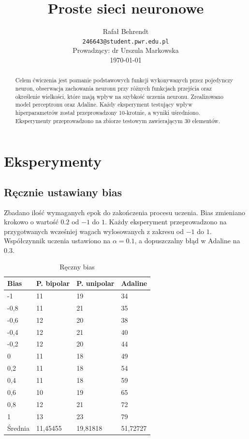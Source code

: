 \documentclass{article}
\title{ Proste sieci neuronowe }
\author{
  Rafał Behrendt \\
  \texttt{246643@student.pwr.edu.pl} \\
  Prowadzący: dr Urszula Markowska \\
  \today
}
\begin{document}
\maketitle

\begin{abstract}
  Celem ćwiczenia jest poznanie podstawowych funkcji wykonywanych przez pojedynczy neuron,
  obserwacja zachowania neuronu przy różnych funkcjach przejścia oraz określenie wielkości, 
  które mają wpływ na szybkość uczenia neuronu. Zrealizowano model perceptronu oraz Adaline.
  Każdy eksperyment testujący wpływ hiperparametrów został przeprowadzony 10-krotnie,
  a wyniki uśredniono. Eksperymenty przeprowadzono na zbiorze testowym zawierającym 30 elementów.
\end{abstract}

\newpage
\section{Eksperymenty}

\subsection{Ręcznie ustawiany bias}

Zbadano ilość wymaganych epok do zakończenia procesu uczenia.
Bias zmieniano krokowo o wartość $0.2$ od $-1$ do $1$. Każdy eksperyment przeprowadzono na przygotwanych
wcześniej wagach wylosowanych z zakresu od $-1$ do $1$. Współczynnik uczenia ustawiono na $\alpha = 0.1$,
a dopuszczalny błąd w Adaline na $0.3$.

\begin{table}[h]
  \centering
    
  \bgroup
  \def\arraystretch{1.3}
  \begin{tabular}{|l|l|l|l|}
  \hline
  Bias & P. bipolar & P. unipolar & Adaline  \\ \hline
  -1 & 11 & 19 & 34 \\ \hline
  -0,8 & 11 & 21 & 35 \\ \hline
  -0,6 & 12 & 20 & 38 \\ \hline
  -0,4 & 12 & 21 & 40 \\ \hline
  -0,2 & 12 & 20 & 44 \\ \hline
  0 & 11 & 18 & 49 \\ \hline
  0,2 & 11 & 18 & 54 \\ \hline
  0,4 & 11 & 18 & 59 \\ \hline
  0,6 & 10 & 19 & 65 \\ \hline
  0,8 & 12 & 21 & 72 \\ \hline
  1 & 13 & 23 & 79 \\ \hline
  Średnia & 11,45455 & 19,81818 & 51,72727 \\ \hline
  \end{tabular}
  \egroup
  \vspace{10px}
  \caption{Ręczny bias}
\end{table}
\end{document}

